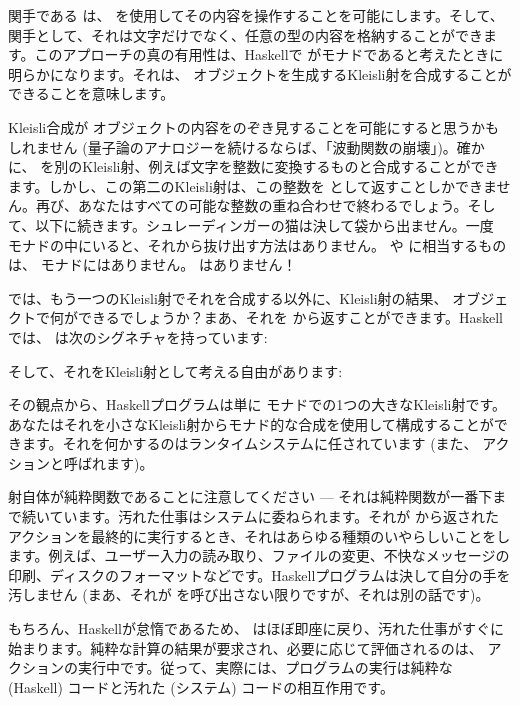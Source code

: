 関手である  は、 を使用してその内容を操作することを可能にします。そして、関手として、それは文字だけでなく、任意の型の内容を格納することができます。このアプローチの真の有用性は、Haskellで  がモナドであると考えたときに明らかになります。それは、 オブジェクトを生成するKleisli射を合成することができることを意味します。

Kleisli合成が  オブジェクトの内容をのぞき見することを可能にすると思うかもしれません (量子論のアナロジーを続けるならば、「波動関数の崩壊」)。確かに、 を別のKleisli射、例えば文字を整数に変換するものと合成することができます。しかし、この第二のKleisli射は、この整数を  として返すことしかできません。再び、あなたはすべての可能な整数の重ね合わせで終わるでしょう。そして、以下に続きます。シュレーディンガーの猫は決して袋から出ません。一度  モナドの中にいると、それから抜け出す方法はありません。  や  に相当するものは、 モナドにはありません。 はありません！

では、もう一つのKleisli射でそれを合成する以外に、Kleisli射の結果、 オブジェクトで何ができるでしょうか？まあ、それを  から返すことができます。Haskellでは、 は次のシグネチャを持っています: 

そして、それをKleisli射として考える自由があります: 

その観点から、Haskellプログラムは単に  モナドでの1つの大きなKleisli射です。あなたはそれを小さなKleisli射からモナド的な合成を使用して構成することができます。それを何かするのはランタイムシステムに任されています (また、 アクションと呼ばれます)。

射自体が純粋関数であることに注意してください --- それは純粋関数が一番下まで続いています。汚れた仕事はシステムに委ねられます。それが  から返された  アクションを最終的に実行するとき、それはあらゆる種類のいやらしいことをします。例えば、ユーザー入力の読み取り、ファイルの変更、不快なメッセージの印刷、ディスクのフォーマットなどです。Haskellプログラムは決して自分の手を汚しません (まあ、それが  を呼び出さない限りですが、それは別の話です)。

もちろん、Haskellが怠惰であるため、 はほぼ即座に戻り、汚れた仕事がすぐに始まります。純粋な計算の結果が要求され、必要に応じて評価されるのは、 アクションの実行中です。従って、実際には、プログラムの実行は純粋な (Haskell) コードと汚れた (システム) コードの相互作用です。

